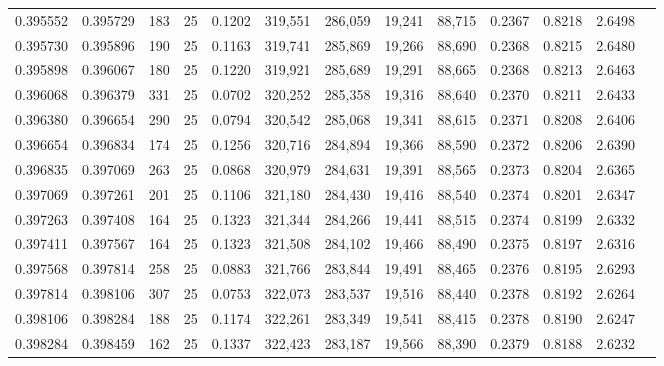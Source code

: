 \begin{tabular}{rrrrrrrrrrrrr}
0.395552 & 0.395729 &   183 &  25 &                                     0.1202 & 319,551 & 286,059 &  19,241 &  88,715 & 0.2367 & 0.8218 & 2.6498 \\
0.395730 & 0.395896 &   190 &  25 &                                     0.1163 & 319,741 & 285,869 &  19,266 &  88,690 & 0.2368 & 0.8215 & 2.6480 \\
0.395898 & 0.396067 &   180 &  25 &                                     0.1220 & 319,921 & 285,689 &  19,291 &  88,665 & 0.2368 & 0.8213 & 2.6463 \\
0.396068 & 0.396379 &   331 &  25 &                                     0.0702 & 320,252 & 285,358 &  19,316 &  88,640 & 0.2370 & 0.8211 & 2.6433 \\
0.396380 & 0.396654 &   290 &  25 &                                     0.0794 & 320,542 & 285,068 &  19,341 &  88,615 & 0.2371 & 0.8208 & 2.6406 \\
0.396654 & 0.396834 &   174 &  25 &                                     0.1256 & 320,716 & 284,894 &  19,366 &  88,590 & 0.2372 & 0.8206 & 2.6390 \\
0.396835 & 0.397069 &   263 &  25 &                                     0.0868 & 320,979 & 284,631 &  19,391 &  88,565 & 0.2373 & 0.8204 & 2.6365 \\
0.397069 & 0.397261 &   201 &  25 &                                     0.1106 & 321,180 & 284,430 &  19,416 &  88,540 & 0.2374 & 0.8201 & 2.6347 \\
0.397263 & 0.397408 &   164 &  25 &                                     0.1323 & 321,344 & 284,266 &  19,441 &  88,515 & 0.2374 & 0.8199 & 2.6332 \\
0.397411 & 0.397567 &   164 &  25 &                                     0.1323 & 321,508 & 284,102 &  19,466 &  88,490 & 0.2375 & 0.8197 & 2.6316 \\
0.397568 & 0.397814 &   258 &  25 &                                     0.0883 & 321,766 & 283,844 &  19,491 &  88,465 & 0.2376 & 0.8195 & 2.6293 \\
0.397814 & 0.398106 &   307 &  25 &                                     0.0753 & 322,073 & 283,537 &  19,516 &  88,440 & 0.2378 & 0.8192 & 2.6264 \\
0.398106 & 0.398284 &   188 &  25 &                                     0.1174 & 322,261 & 283,349 &  19,541 &  88,415 & 0.2378 & 0.8190 & 2.6247 \\
0.398284 & 0.398459 &   162 &  25 &                                     0.1337 & 322,423 & 283,187 &  19,566 &  88,390 & 0.2379 & 0.8188 & 2.6232 \\

\end{tabular}
